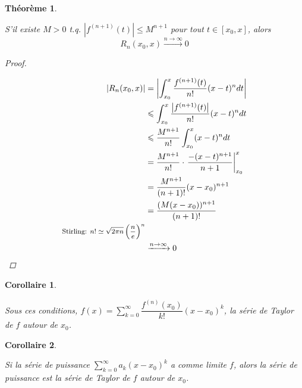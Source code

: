 \documentclass{report}
\newcommand*{\dsum}[4]{\displaystyle\sum_{#1=#2}^{#3}#4}
\newcommand*{\dint}[3]{\displaystyle\int_{#1}^{#2}#3}
\newcommand*{\abs}[1]{\left| #1 \right|}
\newcommand*{\lte}{\leqslant}
\newtheorem*{thm}{Th\'eor\`eme}
\newtheorem*{coro}{Corollaire}
\theoremstyle{definition}
\theoremstyle{remark}
\begin{document}
	\begin{thm}~

		S'il existe $M>0$ t.q. $\abs{f^{(n+1)}(t)} \lte M^{n+1}$ pour tout $t \in [x_0, x]$, alors
		\[
			R_n(x_0, x) \xrightarrow{n \to \infty} 0
		\]
		\begin{proof}~

			\begin{align*}
				\abs{R_n(x_0, x)}&= \abs{\dint{x_0}{x}{\dfrac{f^{(n+1)}(t)}{n!}(x-t)^n dt}}\\
				&\lte \dint{x_0}{x}{\dfrac{\abs{f^{(n+1)}(t)}}{n!}(x-t)^n dt}\\
				&\lte \dfrac{M^{n+1}}{n!}\dint{x_0}{x}{(x-t)^n dt}\\
				&= \dfrac{M^{n+1}}{n!} \cdot \left. \dfrac{-(x-t)^{n+1}}{n+1} \right|_{x_0}^x\\
				&= \dfrac{M^{n+1}}{(n+1)!}(x-x_0)^{n+1}\\
				&= \dfrac{(M(x-x_0))^{n+1}}{(n+1)!}\\
				\text{\footnotesize Stirling: $n! \simeq \sqrt{2\pi n}\left(\frac{n}{e}\right)^n$}\\
				&\xrightarrow{n \to \infty} 0
			\end{align*}
		\end{proof}
	\end{thm}
	\begin{coro}~

		Sous ces conditions, $f(x) = \dsum{k}{0}{\infty}{\dfrac{f^{(n)}(x_0)}{k!}(x-x_0)^k}$, la s\'erie de Taylor de $f$ autour de $x_0$.
	\end{coro}
	\begin{coro}~

		Si la s\'erie de puissance $\dsum{k}{0}{\infty}{a_k(x-x_0)^k}$ a comme limite $f$, alors la s\'erie de puissance est la s\'erie de Taylor de $f$ autour de $x_0$.
	\end{coro}
\end{document}
